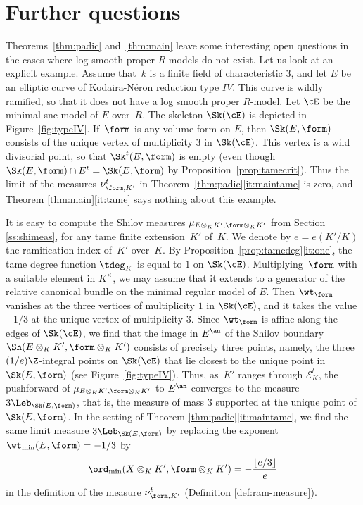 \section{Further questions}
Theorems~\ref{thm:padic} and~\ref{thm:main} leave some interesting open questions in the cases where log smooth proper $R$\nobreakdash-models do not exist. Let us look at an explicit example.
Assume that~$k$ is a finite field of characteristic $3$, and let $E$ be an elliptic curve of Kodaira-Néron reduction type $IV$.
This curve is wildly ramified, so that it does not have a log smooth proper $R$\nobreakdash-model. Let $\cE$ be the minimal snc-model of $E$ over~$R$. The skeleton $\Sk(\cE)$ is depicted in Figure~\ref{fig:typeIV}. If~$\form$ is any volume form on $E$, then $\Sk(E,\form)$ consists of the unique vertex of multiplicity $3$ in $\Sk(\cE)$. This vertex is a wild divisorial point, so that $\Sk^t(E,\form)$ is empty (even though $\Sk(E,\form)\cap E^t=\Sk(E,\form)$ by Proposition~\ref{prop:tamecrit}). Thus the limit of the measures $\nu^t_{\form, K'}$ in Theorem~\ref{thm:padic}\eqref{it:maintame} is zero, and Theorem \ref{thm:main}\eqref{it:tame} says nothing about this example.

It is easy to compute the Shilov measures $\mu_{E\otimes_K K',\form\otimes_K K'}$ from Section \ref{ss:shimeas}, for any tame finite extension~$K'$ of~$K$. We denote by $e=e(K'/K)$ the ramification index of~$K'$ over~$K$. By Proposition~\ref{prop:tamedeg}\eqref{it:one}, the tame degree function $\tdeg_K$ is equal to $1$ on $\Sk(\cE)$.
Multiplying~$\form$ with a suitable element in $K^{\times}$, we may assume that it extends to a generator of the relative canonical bundle on the minimal regular model of $E$.
Then $\wt_{\form}$ vanishes at the three vertices of multiplicity $1$ in $\Sk(\cE)$, and it takes the value $-1/3$ at the unique vertex of multiplicity $3$. Since $\wt_{\form}$ is affine along the edges of $\Sk(\cE)$, we find that the image in $E^{\an}$ of the Shilov boundary $\Sh(E\otimes_K K',\form\otimes_K K')$ consists of precisely three points, namely, the three $(1/e)\Z$-integral points on $\Sk(\cE)$ that lie closest to the unique point in $\Sk(E,\form)$ (see Figure~\ref{fig:typeIV}).
Thus, as~$K'$ ranges through $\mathcal{E}^t_K$, the pushforward of $\mu_{E\otimes_K K',\form\otimes_K K'}$ to $E^{\an}$ converges to the measure $3\Leb_{\Sk(E,\form)}$, that is, the measure of mass $3$ supported at the unique point of $\Sk(E,\form)$.
In the setting of Theorem \ref{thm:padic}\eqref{it:maintame}, we find the same limit measure $3\Leb_{\Sk(E,\form)}$ by
replacing the exponent $\wt_{\min}(E,\form)=-1/3$ by\vspace*{-3pt}\enlargethispage{\baselineskip}%
\[
\ord_{\min}(X\otimes_K K',\form\otimes_K K')=-\frac{\lfloor e/3 \rfloor}{e}
\]
in the definition of the measure $\nu^t_{\form,K'}$ (Definition \ref{def:ram-measure}).

